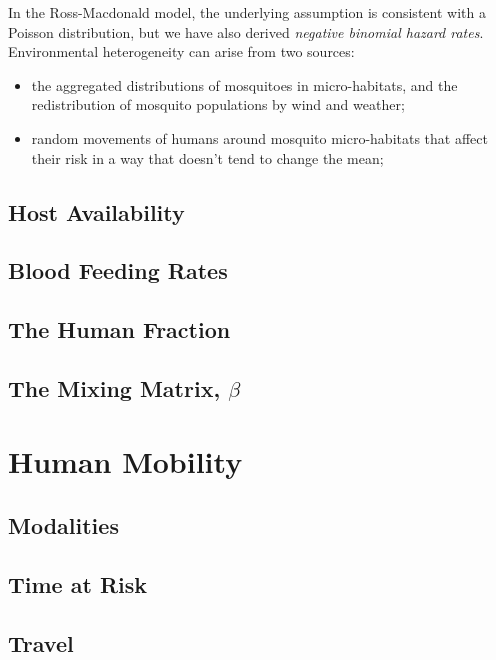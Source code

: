 \documentclass[
]{book}
\begin{document}
In the Ross-Macdonald model, the underlying assumption is consistent with a Poisson distribution, but we have also derived \emph{negative binomial hazard rates}. Environmental heterogeneity can arise from two sources:

\begin{itemize}
\item
  the aggregated distributions of mosquitoes in micro-habitats, and the redistribution of mosquito populations by wind and weather;
\item
  random movements of humans around mosquito micro-habitats that affect their risk in a way that doesn't tend to change the mean;
\end{itemize}

\section{Host Availability}\label{host-availability}

\section{Blood Feeding Rates}\label{blood-feeding-rates}

\section{The Human Fraction}\label{the-human-fraction}

\section{\texorpdfstring{The Mixing Matrix, \(\beta\)}{The Mixing Matrix, \textbackslash beta}}\label{the-mixing-matrix-beta}

\chapter{Human Mobility}\label{human-mobility}

\section{Modalities}\label{modalities}

\section{Time at Risk}\label{time-at-risk}

\section{Travel}\label{travel}
\end{document}
